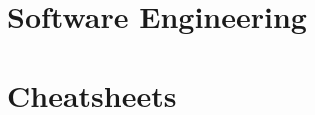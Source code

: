 \documentclass[A4,12pt,twoside]{book}
\begin{document}
\part{Software Engineering}


\part{Cheatsheets}

\nocite{*} %
\printbibliography %
\end{document}
